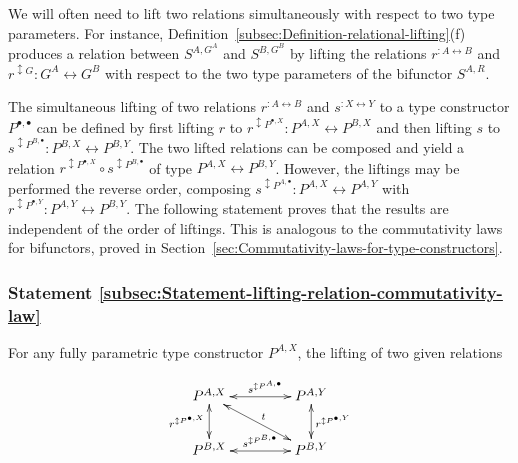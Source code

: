 We will often need to lift two relations simultaneously with respect
to two type parameters. For instance, Definition~\ref{subsec:Definition-relational-lifting}(f)
produces a relation between $S^{A,G^{A}}$ and $S^{B,G^{B}}$ by lifting
the relations $r^{:A\leftrightarrow B}$ and $r^{\updownarrow G}:G^{A}\leftrightarrow G^{B}$
with respect to the two type parameters of the bifunctor $S^{A,R}$.

The simultaneous lifting of two relations $r^{:A\leftrightarrow B}$
and $s^{:X\leftrightarrow Y}$ to a type constructor $P^{\bullet,\bullet}$
can be defined by first lifting $r$ to $r^{\updownarrow P^{\bullet,X}}:P^{A,X}\leftrightarrow P^{B,X}$
and then lifting $s$ to $s^{\updownarrow P^{B,\bullet}}:P^{B,X}\leftrightarrow P^{B,Y}$.
The two lifted relations can be composed and yield a relation $r^{\updownarrow P^{\bullet,X}}\circ s^{\updownarrow P^{B,\bullet}}$
of type $P^{A,X}\leftrightarrow P^{B,Y}$. However, the liftings may
be performed the reverse order, composing $s^{\updownarrow P^{A,\bullet}}:P^{A,X}\leftrightarrow P^{A,Y}$
with $r^{\updownarrow P^{\bullet,Y}}:P^{A,Y}\leftrightarrow P^{B,Y}$.
The following statement proves that the results are independent of
the order of liftings. This is analogous to the commutativity laws
for bifunctors, proved in Section~\ref{sec:Commutativity-laws-for-type-constructors}.

\subsubsection{Statement \label{subsec:Statement-lifting-relation-commutativity-law}\ref{subsec:Statement-lifting-relation-commutativity-law}}

For  any fully parametric
type constructor $P^{A,X}$, the lifting of two given relations 

\begin{wrapfigure}{l}{0.28\columnwidth}%
\vspace{-2\baselineskip}
\[
\xymatrix{\xyScaleY{2.0pc}\xyScaleX{3.6pc}P^{A,X}\ar@{<->}[d]\sb(0.45){r^{\updownarrow P^{\bullet,X}}}\ar@{<->}[r]\sp(0.55){s^{\updownarrow P^{A,\bullet}}}\ar@{<->}[rd]\sp(0.5){t} & P^{A,Y}\ar@{<->}[d]\sp(0.45){r^{\updownarrow P^{\bullet,Y}}}\\
P^{B,X}\ar@{<->}[r]\sp(0.5){s^{\updownarrow P^{B,\bullet}}} & P^{B,Y}
}
\]

\vspace{-1.6\baselineskip}
\end{wrapfigure}%

